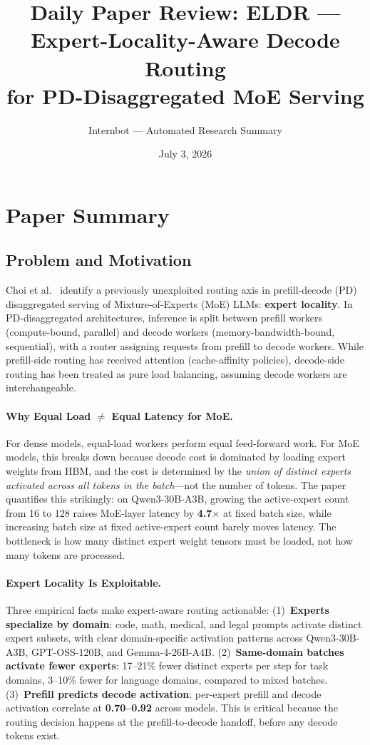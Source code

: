 \documentclass[11pt,a4paper]{article}
\title{Daily Paper Review: ELDR --- Expert-Locality-Aware Decode Routing\\for PD-Disaggregated MoE Serving}
\author{Internbot --- Automated Research Summary}
\date{July 3, 2026}
\begin{document}
\maketitle

\section{Paper Summary}

\subsection{Problem and Motivation}

Choi et al.~\cite{choi2026eldr} identify a previously unexploited routing axis in prefill-decode (PD) disaggregated serving of Mixture-of-Experts (MoE) LLMs: \textbf{expert locality}. In PD-disaggregated architectures, inference is split between prefill workers (compute-bound, parallel) and decode workers (memory-bandwidth-bound, sequential), with a router assigning requests from prefill to decode workers. While prefill-side routing has received attention (cache-affinity policies), decode-side routing has been treated as pure load balancing, assuming decode workers are interchangeable.

\paragraph{Why Equal Load $\neq$ Equal Latency for MoE.} For dense models, equal-load workers perform equal feed-forward work. For MoE models, this breaks down because decode cost is dominated by loading expert weights from HBM, and the cost is determined by the \emph{union of distinct experts activated across all tokens in the batch}---not the number of tokens. The paper quantifies this strikingly: on Qwen3-30B-A3B, growing the active-expert count from 16 to 128 raises MoE-layer latency by \textbf{4.7$\times$} at fixed batch size, while increasing batch size at fixed active-expert count barely moves latency. The bottleneck is how many distinct expert weight tensors must be loaded, not how many tokens are processed.

\paragraph{Expert Locality Is Exploitable.} Three empirical facts make expert-aware routing actionable: (1)~\textbf{Experts specialize by domain}: code, math, medical, and legal prompts activate distinct expert subsets, with clear domain-specific activation patterns across Qwen3-30B-A3B, GPT-OSS-120B, and Gemma-4-26B-A4B. (2)~\textbf{Same-domain batches activate fewer experts}: 17--21\% fewer distinct experts per step for task domains, 3--10\% fewer for language domains, compared to mixed batches. (3)~\textbf{Prefill predicts decode activation}: per-expert prefill and decode activation correlate at \textbf{0.70--0.92} across models. This is critical because the routing decision happens at the prefill-to-decode handoff, before any decode tokens exist.
\end{document}
